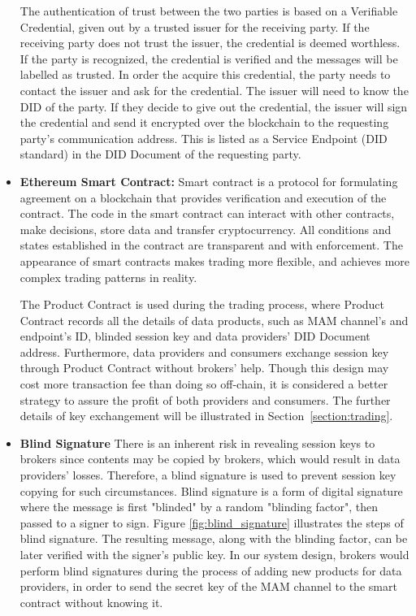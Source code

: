 \documentclass[journal,article,applsci,submit,moreauthors,pdftex]{Definitions/mdpi}
\begin{document}
\begin{itemize}[leftmargin=*,labelsep=5.8mm]
The authentication of trust between the two parties is based on a Verifiable Credential, given out by a trusted issuer for the receiving party. If the receiving party does not trust the issuer, the credential is deemed worthless. If the party is recognized, the credential is verified and the messages will be labelled as trusted. In order the acquire this credential, the party needs to contact the issuer and ask for the credential. The issuer will need to know the DID of the party. If they decide to give out the credential, the issuer will sign the credential and send it encrypted over the blockchain to the requesting party's communication address. This is listed as a Service Endpoint (DID standard) in the DID Document of the requesting party.

\item \textbf{Ethereum Smart Contract: }
Smart contract is a protocol for formulating agreement on a blockchain that provides verification and execution of the contract. The code in the smart contract can interact with other contracts, make decisions, store data and transfer cryptocurrency. All conditions and states established in the contract are transparent and with enforcement. The appearance of smart contracts makes trading more flexible, and achieves more complex trading patterns in reality.

The Product Contract is used during the trading process, where Product Contract records all the details of data products, such as MAM channel's and endpoint's ID, blinded session key and data providers' DID Document address. Furthermore, data providers and consumers exchange session key through Product Contract without brokers' help. Though this design may cost more transaction fee than doing so off-chain, it is considered a better strategy to assure the profit of both providers and consumers. The further details of key exchangement will be illustrated in Section~\ref{section:trading}.

\item \textbf{Blind Signature}
There is an inherent risk in revealing session keys to brokers since contents may be copied by brokers, which would result in data providers' losses. Therefore, a blind signature is used to prevent session key copying for such circumstances. Blind signature\cite{blindSig} is a form of digital signature where the message is first "blinded" by a random "blinding factor", then passed to a signer to sign. Figure \ref{fig:blind_signature} illustrates the steps of blind signature. The resulting message, along with the blinding factor, can be later verified with the signer's public key. In our system design, brokers would perform blind signatures during the process of adding new products for data providers, in order to send the secret key of the MAM channel to the smart contract without knowing it.


\end{itemize}
\end{document}
